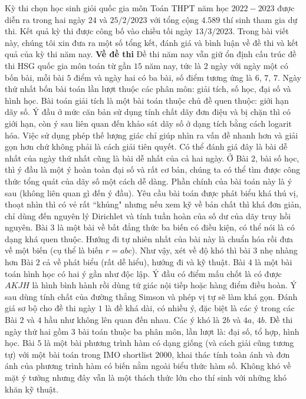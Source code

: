 \begin{multicols}{2}
	Kỳ thi chọn học sinh giỏi quốc gia môn Toán THPT năm học $2022-2023$ được diễn ra trong hai ngày $24$ và $25/2/2023$ với tổng cộng $4{.}589$ thí sinh tham gia dự thi. Kết quả kỳ thi được công bố vào chiều tối ngày $13/3/2023$. Trong bài viết này, chúng tôi xin đưa ra một số tổng kết, đánh giá và bình luận về đề thi và kết quả của kỳ thi năm nay.
	\vskip 0.1cm
	\textbf{\color{cackithi}Về đề thi}
	\vskip 0.1cm
	Đề thi năm nay vẫn giữ ổn định cấu trúc đề thi HSG quốc gia môn toán từ gần $15$ năm nay, tức là $2$ ngày với ngày một có bốn bài, mỗi bài $5$ điểm và ngày hai có ba bài, số điểm tương ứng là $6$, $7$, $7$.
	\vskip 0.1cm 
	Ngày thứ nhất bốn bài toán lần lượt thuộc các phân môn: giải tích, số học, đại số và hình học. Bài toán giải tích là một bài toán thuộc chủ đề quen thuộc: giới hạn dãy số. Ý đầu ở mức căn bản sử dụng tính chất dãy đơn điệu và bị chặn thì có giới hạn, còn ý sau liên quan đến khảo sát dãy số ở dạng tích bằng cách logarit hóa. Việc sử dụng phép thế lượng giác chỉ giúp nhìn ra vấn đề nhanh hơn và giải gọn hơn chứ không phải là cách giải tiên quyết. Có thể đánh giá đây là bài dễ nhất của ngày thứ nhất cũng là bài dễ nhất của cả hai ngày. 
	\vskip 0.1cm
	Ở Bài $2$, bài số học, thì ý đầu là một ý hoàn toàn đại số và rất cơ bản, chúng ta có thể tìm được công thức tổng quát của dãy số một cách dễ dàng. Phần chính của bài toán này là ý sau (không liên quan gì đến ý đầu). Yêu cầu bài toán được phát biểu khá thú vị, thoạt nhìn thì có vẻ rất ``khủng" nhưng nếu xem kỹ về bản chất thì khá đơn giản, chỉ dùng đến nguyên lý Dirichlet và tính tuần hoàn của số dư của dãy truy hồi nguyên. 
	\vskip 0.1cm
	Bài $3$ là một bài về bất đẳng thức ba biến có điều kiện, có thể nói là có dạng khá quen thuộc. Hướng đi tự nhiên nhất của bài này là chuẩn hóa rồi đưa về một biến (cụ thể là biến $r = abc$). Như vậy, xét về độ khó thì bài $3$ nhẹ nhàng hơn Bài $2$ cả về phát biểu (rất dễ hiểu), hướng đi và kỹ thuật.  
	\vskip 0.1cm
	Bài $4$ là một bài toán hình học có hai ý gần như độc lập. Ý đầu có điểm mấu chốt là có được $AKJH$ là hình bình hành rồi dùng tứ giác nội tiếp hoặc hàng điểm điều hoàn. Ý sau dùng tính chất của đường thẳng Simson và phép vị tự sẽ làm khá gọn. 
	\vskip 0.1cm
	Đánh giá sơ bộ cho đề thi ngày $1$ là đề khá dài, có nhiều ý, đặc biệt là các ý trong các Bài $2$ và $4$ hầu như không lên quan đến nhau. Các ý khó là $2b$ và $4a$, $4b$.
	\vskip 0.1cm 
	Đề thi ngày thứ hai gồm $3$ bài toán thuộc ba phân môn, lần lượt là: đại số, tổ hợp, hình học.
	\vskip 0.1cm
	Bài $5$ là một bài phương trình hàm có dạng giống (và cách giải cũng tương tự) với một bài toán trong IMO shortlist $2000$, khai thác tính toàn ánh và đơn ánh của phương trình hàm có biến nằm ngoài biểu thức hàm số. Không khó về mặt ý tưởng nhưng đây vẫn là một thách thức lớn cho thí sinh với những khó khăn kỹ thuật.   

\end{multicols}
